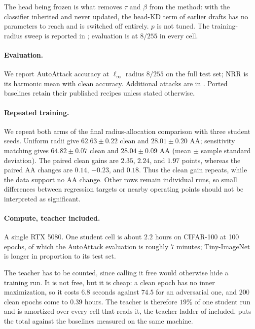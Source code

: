 The head being frozen is what removes $\tau$ and $\beta$ from the method: with the classifier
inherited and never updated, the head-KD term of earlier drafts has no parameters to reach and is
switched off entirely. $p$ is not tuned. The training-radius sweep is reported in
; evaluation is at $8/255$ in every cell.

\paragraph{Evaluation.} We report AutoAttack accuracy at $\ell_\infty$ radius $8/255$ on the full
test set; NRR is its harmonic mean with clean accuracy. Additional attacks are in
. Ported baselines retain their published recipes unless stated
otherwise.

\paragraph{Repeated training.} We repeat both arms of the final radius-allocation comparison with
three student seeds. Uniform radii give $62.63\pm0.22$ clean and $28.01\pm0.20$ AA; sensitivity
matching gives $64.82\pm0.07$ clean and $28.04\pm0.09$ AA (mean $\pm$ sample standard deviation).
The paired clean gains are $2.35$, $2.24$, and $1.97$ points, whereas the paired AA changes are
$0.14$, $-0.23$, and $0.18$. Thus the clean gain repeats, while the data support no AA change.
Other rows remain individual runs, so small differences between regression targets or nearby
operating points should not be interpreted as significant.

\paragraph{Compute, teacher included.} A single RTX 5080. One student cell is about $2.2$ hours on
CIFAR-100 at 100 epochs, of which the AutoAttack evaluation is roughly $7$ minutes; Tiny-ImageNet is
longer in proportion to its test set.

The teacher has to be counted, since calling it free would otherwise hide a training run. It is not
free, but it is cheap: a clean epoch has no inner maximization, so it costs $6.8$ seconds against
$74.5$ for an adversarial one, and $200$ clean epochs come to $0.39$ hours. The teacher is therefore
$19\%$ of one student run and is amortized over every cell that reads it, the teacher ladder of
 included.  puts the total against the baselines measured
on the same machine.

